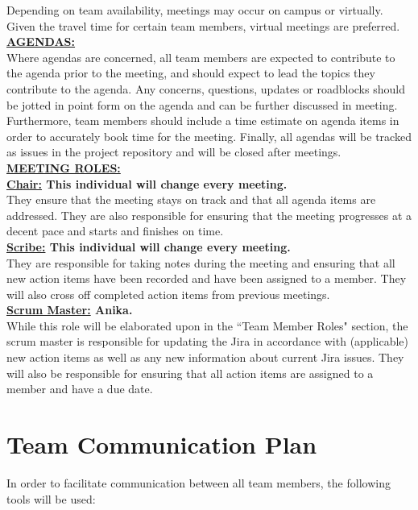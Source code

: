 \documentclass{article}
\begin{document}
Depending on team availability, meetings may occur on campus or virtually. 
Given the travel time for certain team members, virtual meetings are preferred.\\

\noindent \textbf{\underline{AGENDAS:}} \\

Where agendas are concerned, all team members are expected to contribute to the agenda prior to the meeting, and should expect to lead the topics they contribute to the agenda. 
Any concerns, questions, updates or roadblocks should be jotted in point form on the agenda and can be further discussed in meeting. 
Furthermore, team members should include a time estimate on agenda items in order to accurately book time for the meeting.
Finally, all agendas will be tracked as issues in the project repository and will be closed after meetings. \\

\noindent \textbf{\underline{MEETING ROLES:}} \\

\noindent \textbf{\underline{Chair:} This individual will change every meeting. } \\
\noindent They ensure that the meeting stays on track and that all agenda items are addressed. 
They are also responsible for ensuring that the meeting progresses at a decent pace and starts and finishes on time. \\

\noindent \textbf{\underline{Scribe:} This individual will change every meeting.} \\
\noindent They are responsible for taking notes during the meeting and ensuring that all new action items have been recorded and have been assigned to a member.
They will also cross off completed action items from previous meetings.\\

\noindent \textbf{\underline{Scrum Master:} Anika.} \\
\noindent While this role will be elaborated upon in the ``Team Member Roles" section, the scrum master is responsible for updating the Jira in accordance with (applicable) new action items as well as any new information about current Jira issues.
They will also be responsible for ensuring that all action items are assigned to a member and have a due date.\\



\section{Team Communication Plan}
In order to facilitate communication between all team members, the following tools will be used:
\end{document}
